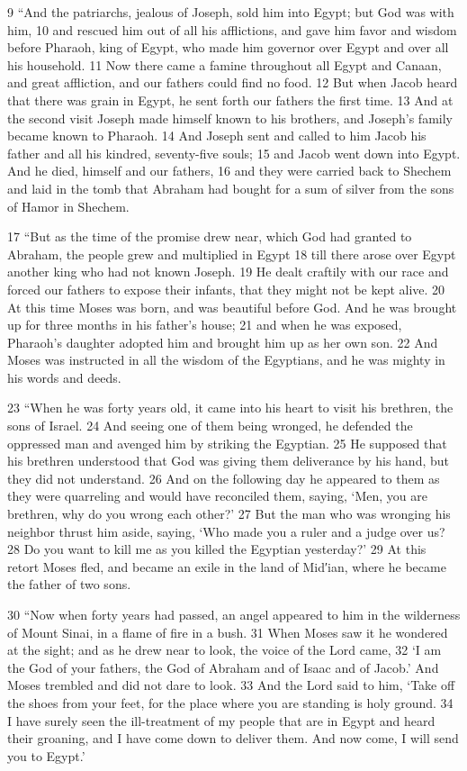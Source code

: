 \documentclass[letterpaper]{report}
\begin{document}
\begin{multicols}{2}
9 “And the patriarchs, jealous of Joseph, sold him into Egypt; but God was with him, 10 and rescued him out of all his afflictions, and gave him favor and wisdom before Pharaoh, king of Egypt, who made him governor over Egypt and over all his household. 11 Now there came a famine throughout all Egypt and Canaan, and great affliction, and our fathers could find no food. 12 But when Jacob heard that there was grain in Egypt, he sent forth our fathers the first time. 13 And at the second visit Joseph made himself known to his brothers, and Joseph’s family became known to Pharaoh. 14 And Joseph sent and called to him Jacob his father and all his kindred, seventy-five souls; 15 and Jacob went down into Egypt. And he died, himself and our fathers, 16 and they were carried back to Shechem and laid in the tomb that Abraham had bought for a sum of silver from the sons of Hamor in Shechem.

17 “But as the time of the promise drew near, which God had granted to Abraham, the people grew and multiplied in Egypt 18 till there arose over Egypt another king who had not known Joseph. 19 He dealt craftily with our race and forced our fathers to expose their infants, that they might not be kept alive. 20 At this time Moses was born, and was beautiful before God. And he was brought up for three months in his father’s house; 21 and when he was exposed, Pharaoh’s daughter adopted him and brought him up as her own son. 22 And Moses was instructed in all the wisdom of the Egyptians, and he was mighty in his words and deeds.

23 “When he was forty years old, it came into his heart to visit his brethren, the sons of Israel. 24 And seeing one of them being wronged, he defended the oppressed man and avenged him by striking the Egyptian. 25 He supposed that his brethren understood that God was giving them deliverance by his hand, but they did not understand. 26 And on the following day he appeared to them as they were quarreling and would have reconciled them, saying, ‘Men, you are brethren, why do you wrong each other?’ 27 But the man who was wronging his neighbor thrust him aside, saying, ‘Who made you a ruler and a judge over us? 28 Do you want to kill me as you killed the Egyptian yesterday?’ 29 At this retort Moses fled, and became an exile in the land of Mid′ian, where he became the father of two sons.

30 “Now when forty years had passed, an angel appeared to him in the wilderness of Mount Sinai, in a flame of fire in a bush. 31 When Moses saw it he wondered at the sight; and as he drew near to look, the voice of the Lord came, 32 ‘I am the God of your fathers, the God of Abraham and of Isaac and of Jacob.’ And Moses trembled and did not dare to look. 33 And the Lord said to him, ‘Take off the shoes from your feet, for the place where you are standing is holy ground. 34 I have surely seen the ill-treatment of my people that are in Egypt and heard their groaning, and I have come down to deliver them. And now come, I will send you to Egypt.’


\end{multicols}
\end{document}
